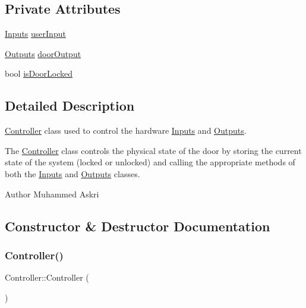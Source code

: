\subsection*{Private Attributes}
\begin{DoxyCompactItemize}
\item 
\hyperlink{classInputs}{Inputs} \hyperlink{classController_a92f87bee57ce9161bb5df6b5e69fedb7}{user\+Input}
\item 
\hyperlink{classOutputs}{Outputs} \hyperlink{classController_a3eb48522d8dd1a23add8245718b32afc}{door\+Output}
\item 
bool \hyperlink{classController_a9101b152cf0c199bc384d977d61292c6}{is\+Door\+Locked}
\end{DoxyCompactItemize}


\subsection{Detailed Description}
\hyperlink{classController}{Controller} class used to control the hardware \hyperlink{classInputs}{Inputs} and \hyperlink{classOutputs}{Outputs}. 

The \hyperlink{classController}{Controller} class controls the physical state of the door by storing the current state of the system (locked or unlocked) and calling the appropriate methods of both the \hyperlink{classInputs}{Inputs} and \hyperlink{classOutputs}{Outputs} classes.

\begin{DoxyAuthor}{Author}
Muhammed Askri 
\end{DoxyAuthor}


\subsection{Constructor \& Destructor Documentation}
\mbox{\label{classController_a95c56822d667e94b031451729ce069a9}} 
\subsubsection{\texorpdfstring{Controller()}{Controller()}}
{\footnotesize\ttfamily Controller\+::\+Controller (\begin{DoxyParamCaption}{ }\end{DoxyParamCaption})}



